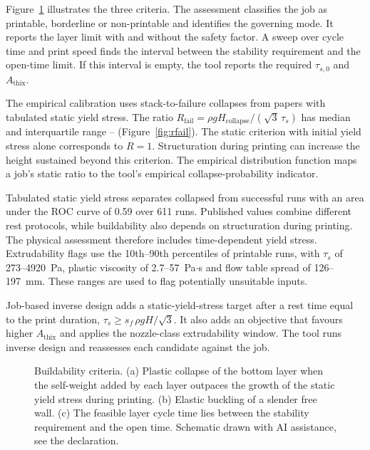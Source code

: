 \documentclass[preprint,12pt]{elsarticle}
\newcommand{\aidisclosure}{Schematic drawn with AI assistance, see the declaration.}
\begin{document}
Figure~\ref{fig:criteria} illustrates the three criteria. The assessment classifies the job as printable, borderline or non-printable and identifies the governing mode. It reports the layer limit with and without the safety factor. A sweep over cycle time and print speed finds the interval between the stability requirement and the open-time limit. If this interval is empty, the tool reports the required $\tau_{s,0}$ and $A_{\mathrm{thix}}$.

The empirical calibration uses \nrFailN{} stack-to-failure collapses from \nrFailPapers{} papers with tabulated static yield stress. The ratio $R_{\mathrm{fail}} = \rho g H_{\mathrm{collapse}} / (\sqrt{3}\,\tau_s)$ has median \nrFailMedian{} and interquartile range \nrFailPtf{}--\nrFailPsf{} (Figure~\ref{fig:rfail}). The static criterion with initial yield stress alone corresponds to $R = 1$. Structuration during printing can increase the height sustained beyond this criterion. The empirical distribution function maps a job's static ratio to the tool's empirical collapse-probability indicator.

Tabulated static yield stress separates collapsed from successful runs with an area under the ROC curve of 0.59 over 611 runs. Published values combine different rest protocols, while buildability also depends on structuration during printing. The physical assessment therefore includes time-dependent yield stress. Extrudability flags use the 10th--90th percentiles of printable runs, with $\tau_s$ of 273--4920~Pa, plastic viscosity of 2.7--57~Pa$\cdot$s and flow table spread of 126--197~mm. These ranges are used to flag potentially unsuitable inputs.

Job-based inverse design adds a static-yield-stress target after a rest time equal to the print duration, $\tau_s \ge s_f\,\rho g H / \sqrt{3}$. It also adds an objective that favours higher $A_{\mathrm{thix}}$ and applies the nozzle-class extrudability window. The tool runs inverse design and reassesses each candidate against the job.

\begin{figure}[t]
\centering
\resizebox{\textwidth}{!}{}
\caption{Buildability criteria. (a) Plastic collapse of the bottom layer when the self-weight added by each layer outpaces the growth of the static yield stress during printing. (b) Elastic buckling of a slender free wall. (c) The feasible layer cycle time lies between the stability requirement and the open time. \aidisclosure}
\label{fig:criteria}
\end{figure}
\end{document}
